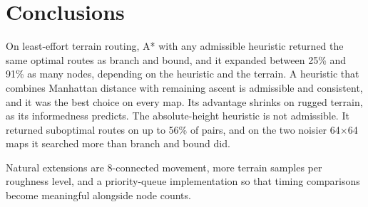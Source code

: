 \chapter{Conclusions}
\label{ch:conclusion}

On least-effort terrain routing, A* with any admissible heuristic returned the same optimal routes as branch and bound, and it expanded between 25\% and 91\% as many nodes, depending on the heuristic and the terrain. A heuristic that combines Manhattan distance with remaining ascent is admissible and consistent, and it was the best choice on every map. Its advantage shrinks on rugged terrain, as its informedness predicts. The absolute-height heuristic is not admissible. It returned suboptimal routes on up to 56\% of pairs, and on the two noisier 64$\times$64 maps it searched more than branch and bound did.

Natural extensions are 8-connected movement, more terrain samples per roughness level, and a priority-queue implementation so that timing comparisons become meaningful alongside node counts.
